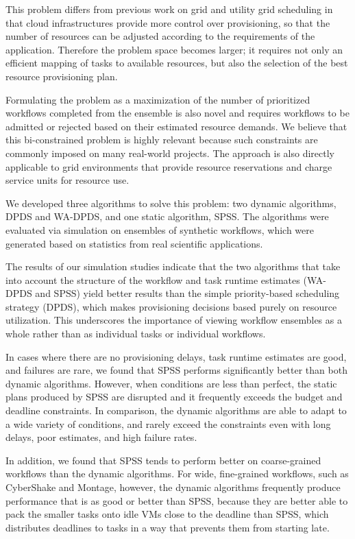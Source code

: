 \documentclass[conference]{IEEEtran}
\begin{document}
This problem differs from previous work on grid and utility grid scheduling
in that cloud infrastructures provide more control over provisioning, so that
the number of resources can be adjusted according to the requirements of the
application. Therefore the problem space becomes larger; it requires not only
an efficient mapping of tasks to available resources, but also the selection
of the best resource provisioning plan.

Formulating the problem as a maximization of the number of prioritized
workflows completed from the ensemble is also novel and requires workflows to
be admitted or rejected based on their estimated resource demands. We believe
that this bi-constrained problem is highly relevant because such constraints
are commonly imposed on many real-world projects. The approach is also
directly applicable to grid environments that provide resource reservations
and charge service units for resource use.

We developed three algorithms to solve this problem: two dynamic algorithms,
DPDS and WA-DPDS, and one static algorithm, SPSS. The algorithms were
evaluated via simulation on ensembles of synthetic workflows, which were
generated based on statistics from real scientific applications.

The results of our simulation studies indicate that the two algorithms that
take into account the structure of the workflow and task runtime estimates
(WA-DPDS and SPSS) yield better results than the simple priority-based
scheduling strategy (DPDS), which makes provisioning decisions based purely on
resource utilization. This underscores the importance of viewing workflow
ensembles as a whole rather than as individual tasks or individual workflows.

In cases where there are no provisioning delays, task runtime estimates are
good, and failures are rare, we found that SPSS
performs significantly better than both dynamic algorithms. However, when
conditions are less than perfect, the static plans produced by SPSS are
disrupted and it frequently exceeds the budget and deadline constraints. In
comparison, the dynamic algorithms are able to adapt to a wide variety of
conditions, and rarely exceed the constraints even with long delays, poor
estimates, and high failure rates.

In addition, we found that SPSS tends to perform better on coarse-grained
workflows than the dynamic algorithms. For wide, fine-grained workflows, such
as CyberShake and Montage, however, the dynamic algorithms frequently produce
performance that is as good or better than SPSS, because they are better able
to pack the smaller tasks onto idle VMs close to the deadline than SPSS,
which distributes deadlines to tasks in a way that prevents them from
starting late.
\end{document}
